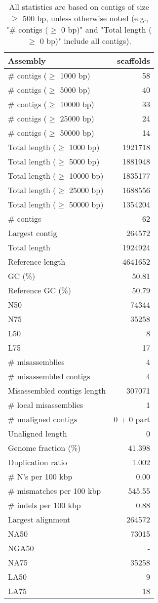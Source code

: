 \documentclass[12pt,a4paper]{article}
\begin{document}
\begin{table}[ht]
\begin{center}
\caption{All statistics are based on contigs of size $\geq$ 500 bp, unless otherwise noted (e.g., "\# contigs ($\geq$ 0 bp)" and "Total length ($\geq$ 0 bp)" include all contigs).}
\begin{tabular}{|l*{1}{|r}|}
\hline
Assembly & scaffolds \\ \hline
\# contigs ($\geq$ 1000 bp) & 58 \\ \hline
\# contigs ($\geq$ 5000 bp) & 40 \\ \hline
\# contigs ($\geq$ 10000 bp) & 33 \\ \hline
\# contigs ($\geq$ 25000 bp) & 24 \\ \hline
\# contigs ($\geq$ 50000 bp) & 14 \\ \hline
Total length ($\geq$ 1000 bp) & 1921718 \\ \hline
Total length ($\geq$ 5000 bp) & 1881948 \\ \hline
Total length ($\geq$ 10000 bp) & 1835177 \\ \hline
Total length ($\geq$ 25000 bp) & 1688556 \\ \hline
Total length ($\geq$ 50000 bp) & 1354204 \\ \hline
\# contigs & 62 \\ \hline
Largest contig & 264572 \\ \hline
Total length & 1924924 \\ \hline
Reference length & 4641652 \\ \hline
GC (\%) & 50.81 \\ \hline
Reference GC (\%) & 50.79 \\ \hline
N50 & 74344 \\ \hline
N75 & 35258 \\ \hline
L50 & 8 \\ \hline
L75 & 17 \\ \hline
\# misassemblies & 4 \\ \hline
\# misassembled contigs & 4 \\ \hline
Misassembled contigs length & 307071 \\ \hline
\# local misassemblies & 1 \\ \hline
\# unaligned contigs & 0 + 0 part \\ \hline
Unaligned length & 0 \\ \hline
Genome fraction (\%) & 41.398 \\ \hline
Duplication ratio & 1.002 \\ \hline
\# N's per 100 kbp & 0.00 \\ \hline
\# mismatches per 100 kbp & 545.55 \\ \hline
\# indels per 100 kbp & 0.88 \\ \hline
Largest alignment & 264572 \\ \hline
NA50 & 73015 \\ \hline
NGA50 & - \\ \hline
NA75 & 35258 \\ \hline
LA50 & 9 \\ \hline
LA75 & 18 \\ \hline
\end{tabular}
\end{center}
\end{table}
\end{document}
